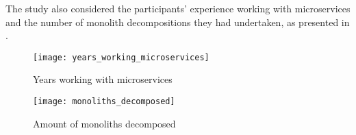 The study also considered the participants' experience working with
microservices and the number of monolith decompositions they had undertaken, as
presented in .

\begin{figure*}[!htb]
  \centering
  \texttt{[image: years\_working\_microservices]}
  \caption{Years working with microservices}
  \label{fig:years_working_microservices}
\end{figure*}

\begin{figure*}[!htb]
  \centering
  \texttt{[image: monoliths\_decomposed]}
  \caption{Amount of monoliths decomposed}
  \label{fig:monoliths_decomposed}
\end{figure*}
